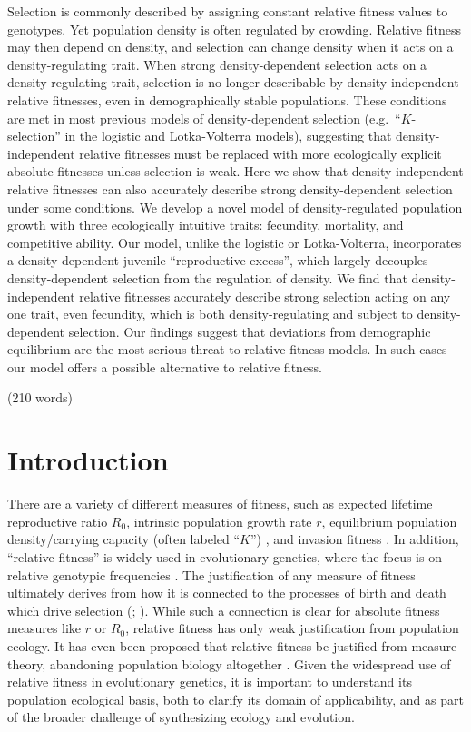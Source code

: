 \documentclass[12pt]{article}
\begin{document}
Selection is commonly described by assigning constant relative fitness values to genotypes. Yet population density is often regulated by crowding. Relative fitness may then depend on density, and selection can change density when it acts on a density-regulating trait. When strong density-dependent selection acts on a density-regulating trait, selection is no longer describable by density-independent relative fitnesses, even in demographically stable populations. These conditions are met in most previous models of density-dependent selection (e.g.~``$K$-selection'' in the logistic and Lotka-Volterra models), suggesting that density-independent relative fitnesses must be replaced with more ecologically explicit absolute fitnesses unless selection is weak. Here we show that density-independent relative fitnesses can also accurately describe strong density-dependent selection under some conditions. We develop a novel model of density-regulated population growth with three ecologically intuitive traits: fecundity, mortality, and competitive ability. Our model, unlike the logistic or Lotka-Volterra, incorporates a density-dependent juvenile ``reproductive excess'', which largely decouples density-dependent selection from the regulation of density. We find that density-independent relative fitnesses accurately describe strong selection acting on any one trait, even fecundity, which is both density-regulating and subject to density-dependent selection. Our findings suggest that deviations from demographic equilibrium are the most serious threat to relative fitness models. In such cases our model offers a possible alternative to relative fitness. 

\noindent (210 words)

\newpage{}


\section*{Introduction}

There are a variety of different measures of fitness, such as expected lifetime reproductive ratio $R_0$, intrinsic population growth rate $r$, equilibrium population density/carrying capacity (often labeled ``$K$'') \citep{benton_2000}, and invasion fitness \citep{metz_1992}. In addition, ``relative fitness'' is widely used in evolutionary genetics, where the focus is on relative genotypic frequencies \cite[pp. 468]{barton_2007}. The justification of any measure of fitness ultimately derives from how it is connected to the processes of birth and death which drive selection (\citealt{metcalf_2007,doebeli_2017}; \citealt[pp. 178]{charlesworth_1994}). While such a connection is clear for absolute fitness measures like $r$ or $R_0$, relative fitness has only weak justification from population ecology. It has even been proposed that relative fitness be justified from measure theory, abandoning population biology altogether \citep{wagner_2010}. Given the widespread use of relative fitness in evolutionary genetics, it is important to understand its population ecological basis, both to clarify its domain of applicability, and as part of the broader challenge of synthesizing ecology and evolution.
\end{document}
